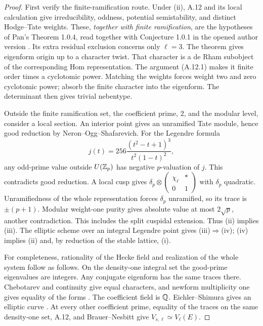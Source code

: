 \begin{proof}
First verify the finite-ramification route.  Under (ii), A.12 and its
local calculation give irreducibility, oddness, potential semistability,
and distinct Hodge--Tate weights.  These, \emph{together with finite
ramification}, are the hypotheses of Pan's Theorem 1.0.4, read together
with Conjecture 1.0.1 in the opened author version
\cite{LegPan2022}.  Its extra residual exclusion concerns only
$\ell=3$.  The theorem gives eigenform origin up to a character twist.
That character is a de Rham subobject of the corresponding Hom
representation.  The argument (A.12.1) makes it finite order times a
cyclotomic power.  Matching the weights forces weight two and zero
cyclotomic power; absorb the finite character into the eigenform.
The determinant then gives trivial nebentype.

Outside the finite ramification set, the coefficient prime, 2, and the
modular level, consider a local section.  An interior point gives an
unramified Tate module, hence good reduction by Neron--Ogg--Shafarevich.
For the Legendre formula
\[
             j(t)=256\frac{(t^2-t+1)^3}{t^2(1-t)^2},
\tag{A.14.1}
\]
any odd-prime value outside $U(\mathbb Z_p)$ has negative $p$-valuation of
$j$.  This contradicts good reduction.  A local cusp gives
$\delta_p\otimes\left(\begin{smallmatrix}\chi_\ell&*\\0&1
\end{smallmatrix}\right)$ with $\delta_p$ quadratic.  Unramifiedness
of the whole representation forces $\delta_p$ unramified, so its trace
is $\pm(p+1)$.  Modular weight-one purity gives absolute value at most
$2\sqrt p$, another contradiction.  This includes the split cuspidal
extension.  Thus (ii) implies (iii).  The elliptic scheme over an
integral Legendre point gives (iii)$\Rightarrow$(iv); (iv) implies (ii)
and, by reduction of the stable lattice, (i).

For completeness, rationality of the Hecke field and realization of the
whole system follow as follows.  On the density-one integral set the
good-prime eigenvalues are integers.  Any conjugate eigenform has the
same traces there.  Chebotarev and continuity give equal characters,
and newform multiplicity one gives equality of the forms
\cite[Theorem 9.4 and the paragraph after Example 9.5]{LegStein2007}.
The coefficient field is $\mathbb Q$.  Eichler--Shimura gives an elliptic
curve \cite[Proposition 11.21]{LegMilneMF2017}.  At every other
coefficient prime, equality of the traces on the same density-one set,
A.12, and Brauer--Nesbitt give $V_{s,\ell}\simeq V_\ell(E)$.


\end{proof}
